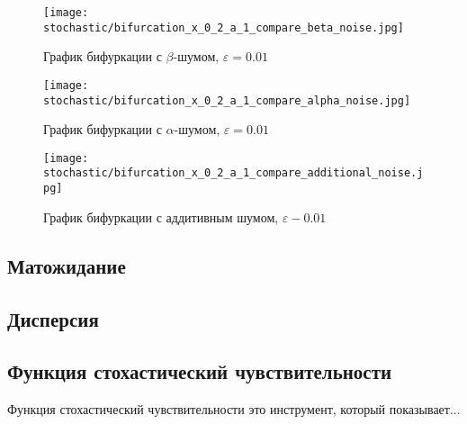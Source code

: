         \begin{figure}
            \centering
            \texttt{[image: stochastic/bifurcation\_x\_0\_2\_a\_1\_compare\_beta\_noise.jpg]}
        
            \captionsetup{justification=centering}
            \caption{График бифуркации с \(\beta\)-шумом, \(\varepsilon = 0.01\)}
            \label{bifurcation_x_0_2_a_1_compare_beta_noise}
        \end{figure}

        \begin{figure}
            \centering
            \texttt{[image: stochastic/bifurcation\_x\_0\_2\_a\_1\_compare\_alpha\_noise.jpg]}
        
            \captionsetup{justification=centering}
            \caption{График бифуркации с \(\alpha\)-шумом, \(\varepsilon = 0.01\)}
            \label{bifurcation_x_0_2_a_1_compare_alpha_noise}
        \end{figure}

        \begin{figure}
            \centering
            \texttt{[image: stochastic/bifurcation\_x\_0\_2\_a\_1\_compare\_additional\_noise.jpg]}
        
            \captionsetup{justification=centering}
            \caption{График бифуркации с аддитивным шумом, \(\varepsilon - 0.01\)}
            \label{bifurcation_x_0_2_a_1_compare_additional_noise}
        \end{figure}

    \subsection{Матожидание}


    \subsection{Дисперсия}


    \subsection{Функция стохастический чувствительности}
    
        Функция стохастический чувствительности это инструмент, который показывает... 

